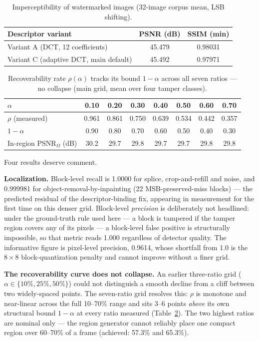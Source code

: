 \documentclass[12pt,a4paper]{article}
\begin{document}
\begin{table}[htbp]
\centering
\caption{Imperceptibility of watermarked images (32-image corpus mean, LSB
shifting).}
\label{tab:imp}
\small
\begin{tabular}{@{}lcc@{}}
\toprule
\textbf{Descriptor variant} & \textbf{PSNR (dB)} & \textbf{SSIM (min)} \\
\midrule
Variant A (DCT, 12 coefficients) & 45.479 & 0.98031 \\
Variant C (adaptive DCT, main default) & 45.492 & 0.97971 \\
\bottomrule
\end{tabular}
\end{table}

\begin{table}[htbp]
\centering
\caption{Recoverability rate $\rho(\alpha)$ tracks its bound $1-\alpha$ across
all seven ratios --- no collapse (main grid, mean over four tamper classes).}
\label{tab:loc}
\small
\begin{tabular}{@{}lccccccc@{}}
\toprule
$\alpha$ & 0.10 & 0.20 & 0.30 & 0.40 & 0.50 & 0.60 & 0.70 \\
\midrule
$\rho$ (measured) & 0.961 & 0.861 & 0.750 & 0.639 & 0.534 & 0.442 & 0.357 \\
$1-\alpha$ & 0.90 & 0.80 & 0.70 & 0.60 & 0.50 & 0.40 & 0.30 \\
In-region PSNR$_\Omega$ (dB) & 30.2 & 29.7 & 29.8 & 29.7 & 29.7 & 29.8 & 29.8 \\
\bottomrule
\end{tabular}
\end{table}

Four results deserve comment.

\textbf{Localization.} Block-level recall is 1.0000 for splice, crop-and-refill
and noise, and 0.999981 for object-removal-by-inpainting (22
MSB-preserved-miss blocks) --- the predicted residual of the
descriptor-binding fix, appearing in measurement for the first time on this
denser grid. Block-level \emph{precision} is deliberately not headlined: under
the ground-truth rule used here --- a block is tampered if the tamper region
covers any of its pixels --- a block-level false positive is structurally
impossible, so that metric reads 1.000 regardless of detector quality. The
informative figure is pixel-level precision, 0.9614, whose shortfall from 1.0
is the $8\times8$ block-quantization penalty and cannot improve without a
finer grid.

\textbf{The recoverability curve does not collapse.} An earlier three-ratio
grid ($\alpha\in\{10\%,25\%,50\%\}$) could not distinguish a smooth decline
from a cliff between two widely-spaced points. The seven-ratio grid resolves
this: $\rho$ is monotone and near-linear across the full 10--70\% range and
sits 3--6 points \emph{above} its own structural bound $1-\alpha$ at every
ratio measured (Table~\ref{tab:loc}). The two highest ratios are nominal only
--- the region generator cannot reliably place one compact region over
60--70\% of a frame (achieved: 57.3\% and 65.3\%).
\end{document}
